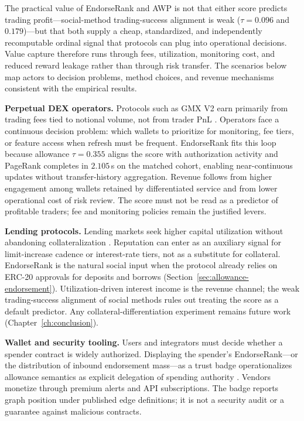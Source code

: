 
The practical value of EndorseRank and AWP is not that either score predicts trading profit---social-method trading-success alignment is weak ($\tau=0.096$ and $0.179$)---but that both supply a cheap, standardized, and independently recomputable ordinal signal that protocols can plug into operational decisions. Value capture therefore runs through fees, utilization, monitoring cost, and reduced reward leakage rather than through risk transfer. The scenarios below map actors to decision problems, method choices, and revenue mechanisms consistent with the empirical results.

\textbf{Perpetual DEX operators.} Protocols such as GMX V2 earn primarily from trading fees tied to notional volume, not from trader PnL . Operators face a continuous decision problem: which wallets to prioritize for monitoring, fee tiers, or feature access when refresh must be frequent. EndorseRank fits this loop because allowance $\tau=0.355$ aligns the score with authorization activity and PageRank completes in $2.105$\,s on the matched cohort, enabling near-continuous updates without transfer-history aggregation. Revenue follows from higher engagement among wallets retained by differentiated service and from lower operational cost of risk review. The score must not be read as a predictor of profitable traders; fee and monitoring policies remain the justified levers.

\textbf{Lending protocols.} Lending markets seek higher capital utilization without abandoning collateralization . Reputation can enter as an auxiliary signal for limit-increase cadence or interest-rate tiers, not as a substitute for collateral. EndorseRank is the natural social input when the protocol already relies on ERC-20 approvals for deposits and borrows (Section~\ref{sec:allowance-endorsement}). Utilization-driven interest income is the revenue channel; the weak trading-success alignment of social methods rules out treating the score as a default predictor. Any collateral-differentiation experiment remains future work (Chapter~\ref{ch:conclusion}).

\textbf{Wallet and security tooling.} Users and integrators must decide whether a spender contract is widely authorized. Displaying the spender's EndorseRank---or the distribution of inbound endorsement mass---as a trust badge operationalizes allowance semantics as explicit delegation of spending authority . Vendors monetize through premium alerts and API subscriptions. The badge reports graph position under published edge definitions; it is not a security audit or a guarantee against malicious contracts.

